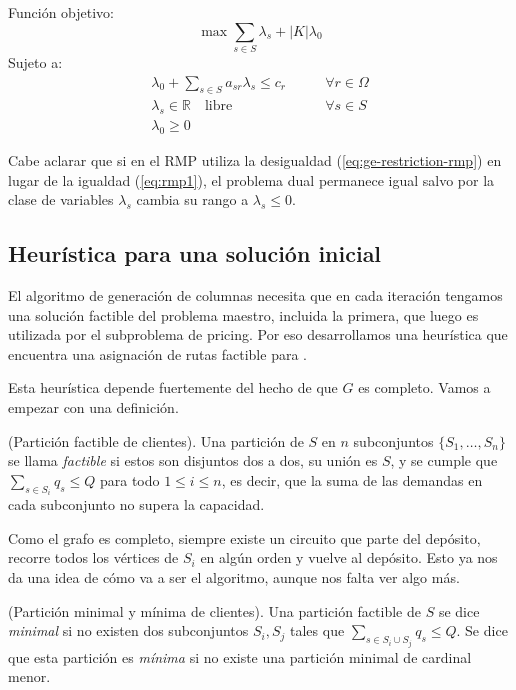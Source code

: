 Función objetivo:
\begin{equation}
    \max \sum_{s \in S} \lambda_s + |K| \lambda_0 
\end{equation}
Sujeto a:
\begin{align}
    \lambda_0 + \sum_{s \in S} {a_{sr} \lambda_s} \leq c_r \qquad & \forall {r \in \Omega} \\
\lambda_s \in \mathbb{R} \quad \text{libre}
\qquad &\forall {s \in S} \\
\lambda_0 \geq 0 &
\end{align}

Cabe aclarar que si en el RMP utiliza la desigualdad (\ref{eq:ge-restriction-rmp}) en lugar de la igualdad (\ref{eq:rmp1}), el problema dual permanece igual salvo por la clase de variables $\lambda_s$ cambia su rango a $\lambda_s \leq 0$. 


\subsection{Heurística para una solución inicial}
\label{section:initial-solution-heuristic}

El algoritmo de generación de columnas necesita que en cada iteración tengamos una solución factible del problema maestro, incluida la primera, que luego es utilizada por el subproblema de pricing. Por eso desarrollamos una heurística que encuentra una asignación de rutas factible para .

Esta heurística depende fuertemente del hecho de que $G$ es completo. Vamos a empezar con una definición.

\begin{definition}
    (Partición factible de clientes).
    Una partición de $S$ en $n$ subconjuntos $\{S_1, \dots, S_n\}$ se llama \emph{factible} si estos son disjuntos dos a dos, su unión es $S$, y se cumple que $\sum_{s \in S_i} q_s \leq Q$ para todo $1 \leq i \leq n$, es decir, que la suma de las demandas en cada subconjunto no supera la capacidad.
\end{definition}

Como el grafo es completo, siempre existe un circuito que parte del depósito, recorre todos los vértices de $S_i$ en algún orden y vuelve al depósito. Esto ya nos da una idea de cómo va a ser el algoritmo, aunque nos falta ver algo más. 

\begin{definition}
    (Partición minimal y mínima de clientes).
    Una partición factible de $S$ se dice \emph{minimal} si no existen dos subconjuntos $S_i, S_j$ tales que $\sum_{s \in S_i \cup S_j} q_s \leq Q$. Se dice que esta partición es \emph{mínima} si no existe una partición minimal de cardinal menor.
\end{definition}

